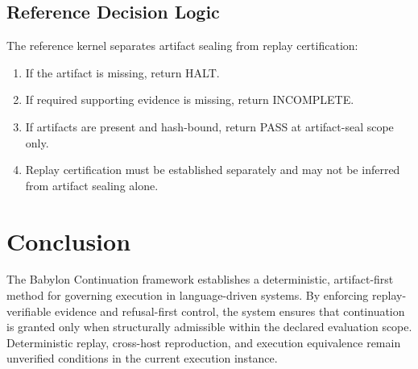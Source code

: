 \documentclass[11pt]{article}
\begin{document}
\subsection{Reference Decision Logic}

The reference kernel separates artifact sealing from replay certification:

\begin{enumerate}
    \item If the artifact is missing, return HALT.
    \item If required supporting evidence is missing, return INCOMPLETE.
    \item If artifacts are present and hash-bound, return PASS at artifact-seal scope only.
    \item Replay certification must be established separately and may not be inferred from artifact sealing alone.
\end{enumerate}

\section{Conclusion}

The Babylon Continuation framework establishes a deterministic, artifact-first method for governing execution in language-driven systems. By enforcing replay-verifiable evidence and refusal-first control, the system ensures that continuation is granted only when structurally admissible within the declared evaluation scope. Deterministic replay, cross-host reproduction, and execution equivalence remain unverified conditions in the current execution instance.



\end{document}
